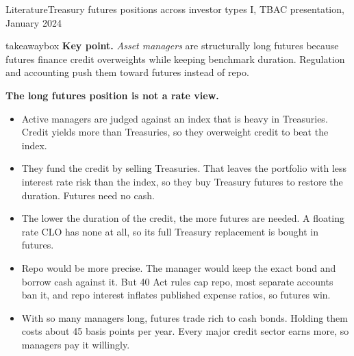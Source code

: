 \documentclass[aspectratio=169,11pt]{beamer}
\newcommand{\keypoint}[1]{%
  \begin{beamercolorbox}[sep=0.6em,wd=\textwidth]{takeawaybox}
    \textbf{Key point.} #1
  \end{beamercolorbox}}
\begin{document}
\begin{frame}{Literature}{Treasury futures positions across investor types I, TBAC presentation, January 2024}
  \footnotesize
  \keypoint{\textit{Asset managers} are structurally long futures because futures finance credit overweights while keeping benchmark duration. Regulation and accounting push them toward futures instead of repo.}
  \medskip
  \textbf{The long futures position is not a rate view.}
  \begin{itemize}
    \item Active managers are judged against an index that is heavy in Treasuries. Credit yields more than Treasuries, so they overweight credit to beat the index.
    \item They fund the credit by selling Treasuries. That leaves the portfolio with less interest rate risk than the index, so they buy Treasury futures to restore the duration. Futures need no cash.
    \item The lower the duration of the credit, the more futures are needed. A floating rate CLO has none at all, so its full Treasury replacement is bought in futures.
    \item Repo would be more precise. The manager would keep the exact bond and borrow cash against it. But 40 Act rules cap repo, most separate accounts ban it, and repo interest inflates published expense ratios, so futures win.
    \item With so many managers long, futures trade rich to cash bonds. Holding them costs about 45 basis points per year. Every major credit sector earns more, so managers pay it willingly.
  \end{itemize}
\end{frame}
\end{document}
